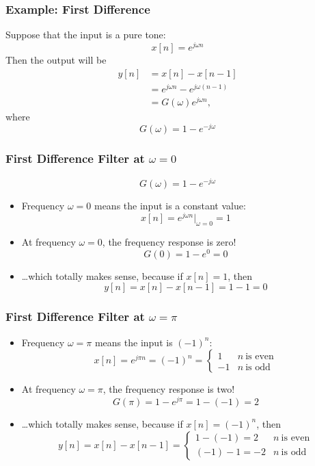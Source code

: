 \documentclass{beamer}
\begin{document}
\begin{frame}
  \frametitle{Example: First Difference}

  Suppose that the input is a pure tone:
  \[
  x[n] = e^{j\omega n}
  \]
  Then the output will be
  \begin{align*}
    y[n] &= x[n]-x[n-1]\\
    &= e^{j\omega n} -e^{j\omega (n-1)}\\
    &= G(\omega) e^{j\omega n},
  \end{align*}
  where
  \[
  G(\omega) = 1-e^{-j\omega}
  \]
\end{frame}

\begin{frame}
  \frametitle{First Difference Filter at $\omega=0$}
  \[
  G(\omega) = 1-e^{-j\omega}
  \]
  \begin{itemize}
  \item Frequency $\omega=0$ means the input is a constant value:
    \[
    x[n] = e^{j\omega n}\vert_{\omega=0} = 1
    \]
  \item At frequency $\omega=0$, the frequency response is zero!
    \[
    G(0) = 1-e^{0} = 0
    \]
  \item \ldots which totally makes sense, because if $x[n]=1$, then
    \[
    y[n]=x[n]-x[n-1] = 1-1 = 0
    \]
  \end{itemize}
\end{frame}

\begin{frame}
  \frametitle{First Difference Filter at $\omega=\pi$}
  \begin{itemize}
  \item Frequency $\omega=\pi$ means the input is $(-1)^n$:
    \[
    x[n] = e^{j\pi n} = (-1)^n= \begin{cases}
      1 & n~\mbox{is even}\\
      -1 & n~\mbox{is odd}
    \end{cases}
    \]
  \item At frequency $\omega=\pi$, the frequency response is two!
    \[
    G(\pi) = 1-e^{j\pi} = 1 - (-1)  = 2
    \]
  \item \ldots which totally makes sense, because if $x[n]=(-1)^n$, then
    \[
    y[n]=x[n]-x[n-1] = \begin{cases}
      1-(-1) = 2 & n~\mbox{is even}\\
      (-1)-1 = -2 & n~\mbox{is odd}
    \end{cases}
    \]
  \end{itemize}
\end{frame}
\end{document}
